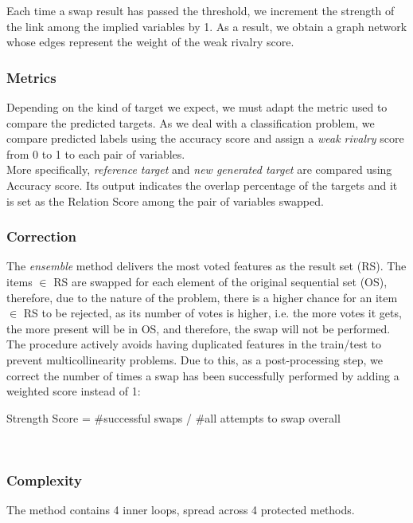 Each time a swap result has passed the threshold, we increment the strength of the link among the implied variables by 1. As a result, we obtain a graph network whose edges represent the weight of the weak rivalry score.

\subsubsection{Metrics}
Depending on the kind of target we expect, we must adapt the metric used to compare the predicted targets. As we deal with a classification problem, we compare predicted labels using the accuracy score and assign a \textit{weak rivalry} score from 0 to 1 to each pair of variables.
\\

More specifically, \emph{reference target} and \emph{new generated target} are compared using Accuracy score. Its output indicates the overlap percentage of the targets and it is set as the Relation Score among the pair of variables swapped.

\subsubsection{Correction}
The \emph{ensemble} method delivers the most voted features as the result set (RS). The items $\in$ RS are swapped for each element of the original sequential set (OS), therefore, due to the nature of the problem, there is a higher chance for an item $\in$ RS to be rejected, as its number of votes is higher, i.e. the more votes it gets, the more present will be in OS, and therefore, the swap will not be performed. The procedure actively avoids having duplicated features in the train/test to prevent multicollinearity problems. Due to this, as a post-processing step, we correct the number of times a swap has been successfully performed by adding a weighted score instead of 1:

\begin{center}
    Strength Score = \#successful swaps / \#all attempts to swap overall
\end{center}


\\

\subsubsection{Complexity}
The method contains 4 inner loops, spread across 4 protected methods.
\\

